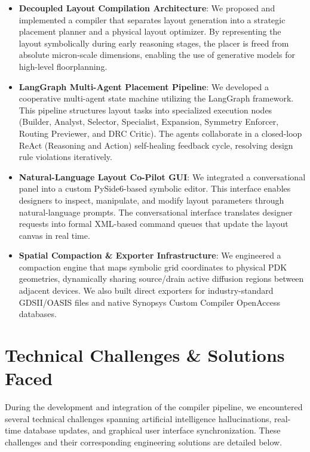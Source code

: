 \begin{itemize}
    \item \textbf{Decoupled Layout Compilation Architecture}: We proposed and implemented a compiler that separates layout generation into a strategic placement planner and a physical layout optimizer. By representing the layout symbolically during early reasoning stages, the placer is freed from absolute micron-scale dimensions, enabling the use of generative models for high-level floorplanning.
    \item \textbf{LangGraph Multi-Agent Placement Pipeline}: We developed a cooperative multi-agent state machine utilizing the LangGraph framework. This pipeline structures layout tasks into specialized execution nodes (Builder, Analyst, Selector, Specialist, Expansion, Symmetry Enforcer, Routing Previewer, and DRC Critic). The agents collaborate in a closed-loop ReAct (Reasoning and Action) self-healing feedback cycle, resolving design rule violations iteratively.
    \item \textbf{Natural-Language Layout Co-Pilot GUI}: We integrated a conversational panel into a custom PySide6-based symbolic editor. This interface enables designers to inspect, manipulate, and modify layout parameters through natural-language prompts. The conversational interface translates designer requests into formal XML-based command queues that update the layout canvas in real time.
    \item \textbf{Spatial Compaction \& Exporter Infrastructure}: We engineered a compaction engine that maps symbolic grid coordinates to physical PDK geometries, dynamically sharing source/drain active diffusion regions between adjacent devices. We also built direct exporters for industry-standard GDSII/OASIS files and native Synopsys Custom Compiler OpenAccess databases.
\end{itemize}

\section[Technical Challenges]{Technical Challenges \& Solutions Faced}
\label{sec:technical_challenges}

During the development and integration of the compiler pipeline, we encountered several technical challenges spanning artificial intelligence hallucinations, real-time database updates, and graphical user interface synchronization. These challenges and their corresponding engineering solutions are detailed below.


